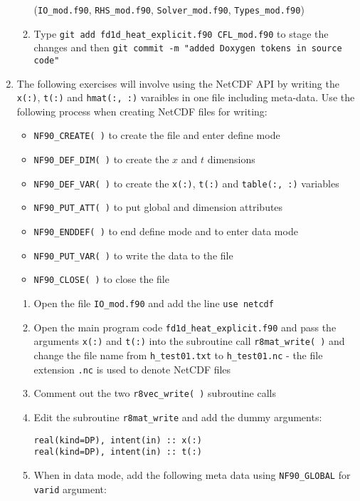 \documentclass[12pt]{article}
\begin{document}
\begin{enumerate}
\begin{enumerate}
(\texttt{IO\_mod.f90}, \texttt{RHS\_mod.f90}, \texttt{Solver\_mod.f90}, \texttt{Types\_mod.f90})
\item Type \texttt{git add fd1d\_heat\_explicit.f90 CFL\_mod.f90} to stage the changes and then 
\texttt{git commit -m "added Doxygen tokens in source code"}
\end{enumerate}
\item The following exercises will involve using the NetCDF API by writing the
  \texttt{x(:)}, \texttt{t(:)} and \texttt{hmat(:, :)} varaibles in one file including meta-data. Use
  the following process when creating NetCDF files for writing:
\begin{itemize}
\item\texttt{NF90\_CREATE( )} to create the file and enter define mode
\item\texttt{NF90\_DEF\_DIM( )} to create the $x$ and $t$ dimensions
\item\texttt{NF90\_DEF\_VAR( )} to create the \texttt{x(:)}, \texttt{t(:)} and
\texttt{table(:, :)} variables
\item\texttt{NF90\_PUT\_ATT( )} to put global and dimension attributes
\item\texttt{NF90\_ENDDEF( )} to end define mode and to enter data mode
\item\texttt{NF90\_PUT\_VAR( )} to write the data to the file
\item\texttt{NF90\_CLOSE( )} to close the file
\end{itemize}
\begin{enumerate}
\item Open the file \texttt{IO\_mod.f90} and add the line \texttt{use netcdf}
\item Open the main program code \texttt{fd1d\_heat\_explicit.f90} and pass the arguments \texttt{x(:)} and
  \texttt{t(:)} into the subroutine call \texttt{r8mat\_write( )} and change the file name from \texttt{h\_test01.txt}
  to \texttt{h\_test01.nc} - the file extension \texttt{.nc} is used to denote NetCDF files
\item Comment out the two \texttt{r8vec\_write( )} subroutine calls
\item Edit the subroutine \texttt{r8mat\_write} and add the dummy arguments:
\begin{verbatim}
real(kind=DP), intent(in) :: x(:)
real(kind=DP), intent(in) :: t(:)
\end{verbatim}
\item When in data mode, add the following meta data using \texttt{NF90\_GLOBAL} for \texttt{varid} argument:

\end{enumerate}
\end{enumerate}
\end{document}
